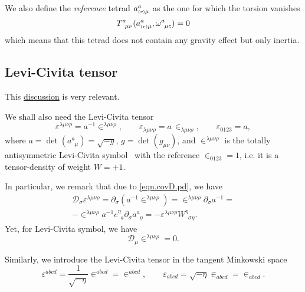 \documentclass[
10pt, %
a4paper, %
oneside, %
headinclude,footinclude, %
BCOR5mm, %
]{scrartcl}
\newcommand{\pd}{\partial}
\newcommand{\itetr}[2]{e^{#1}_{\phantom{#1}#2}}
\newcommand{\tetr}[2]{a^{#1}_{\phantom{#1}#2}}
\newcommand{\rtetr}[2]{a^{#1}_{\mathsmaller{(r)} #2}}
\newcommand{\spin}[2]{\omega^{#1}_{\phantom{#1}#2}}
\newcommand{\D}[1]{\mathcal{D}_{#1}} %
\newcommand{\Tors}[2]{T^{#1}_{\phantom{a}#2}}
\newcommand{\w}[2]{W^{#1}_{\phantom{#1}#2}}
\newcommand{\LCsymb}{\bm{\in}}    %
\newcommand{\LCtens}{\varepsilon} %
\begin{document}
We also define the \textit{reference} tetrad $ \rtetr{a}{\mu}$ as the one for which 
the torsion 
vanishes
\begin{equation}
\Tors{a}{\mu\nu}(\rtetr{a}{\mu},\spin{a}{\mu c}) = 0
\end{equation}
which means that this tetrad does not contain any gravity effect but only inertia.


\subsection{Levi-Civita tensor}

This \href{https://physics.stackexchange.com/questions/429434/lorentz-covariant-derivative-of-the-vielbein-determinant}{discussion} is very relevant.

We shall also need the Levi-Civita tensor
\begin{equation}\label{def.LeviCivita}
\LCtens^{\lambda\mu\nu\rho} = a^{-1} \LCsymb^{\lambda\mu\nu\rho}, 
\qquad 
\LCtens_{\lambda\mu\nu\rho} = 
a \, \LCsymb_{\lambda\mu\nu\rho},
\qquad
\LCtens_{0123} = a,
\end{equation}
where $ a = \det(\tetr{a}{\mu}) = \sqrt{-g}$, $ g = \det(g_{\mu\nu}) $, and $ 
\LCsymb^{{\lambda\mu\nu\rho}} $ is the totally antisymmetric Levi-Civita 
symbol~\cite{AldrovandiPereiraBook} with the reference $ \LCsymb_{0123} = 1 $, 
i.e. it is a tensor-density of weight $ W=+1 $.


In particular, we remark that due to \eqref{eqn.covD.pd}, we have
\begin{multline}\label{eqn.diff.LeviCivita}
\D{\sigma}\LCtens^{\lambda\mu\nu\rho} = 
\pd_{\sigma}(a^{-1}\LCsymb^{\lambda\mu\nu\rho}) = 
\LCsymb^{\lambda\mu\nu\rho}\pd_{\sigma}a^{-1} = 
\\
-\LCsymb^{\lambda\mu\nu\rho}a^{-1}\itetr{\eta}{a}\pd_{\sigma}\tetr{a}{\eta} = 
-\LCtens^{\lambda\mu\nu\rho}\w{\eta}{\sigma\eta}. 
\end{multline}
Yet, for Levi-Civita symbol, we have
\begin{equation}\label{eqn.diff.LCsymb}
\D{\mu}\LCsymb^{\lambda\mu\nu\rho} = 0.
\end{equation}

Similarly, we introduce the Levi-Civita tensor in the tangent Minkowski space
\begin{equation}
\LCtens^{abcd} =\frac{1}{ \sqrt{-\eta}}\LCsymb^{abcd} = \LCsymb^{abcd}, \qquad 
\LCtens_{abcd} = 
\sqrt{-\eta}\LCsymb_{abcd} = \LCsymb_{abcd}.
\end{equation}
\end{document}
